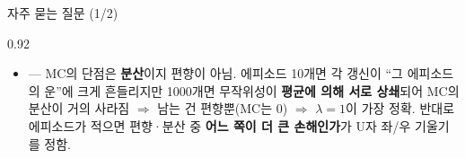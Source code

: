 \begin{frame}{자주 묻는 질문 (1/2)}
\begin{center}\begin{varwidth}{0.92\textwidth}
  \begin{itemize}
    \item {}
      --- MC의 단점은 \textbf{분산}이지 편향이 아님. 에피소드 10개면
      각 갱신이 ``그 에피소드의 운''에 크게 흔들리지만 1000개면
      무작위성이 \textbf{평균에 의해 서로 상쇄}되어 MC의 분산이 거의
      사라짐 $\Rightarrow$ 남는 건 편향뿐(MC는 0) $\Rightarrow$
      $\lambda=1$이 가장 정확. 반대로 에피소드가 적으면 편향·분산
      중 \textbf{어느 쪽이 더 큰 손해인가}가 U자 좌/우 기울기를
      정함.
  \end{itemize}
\end{varwidth}\end{center}
\end{frame}

